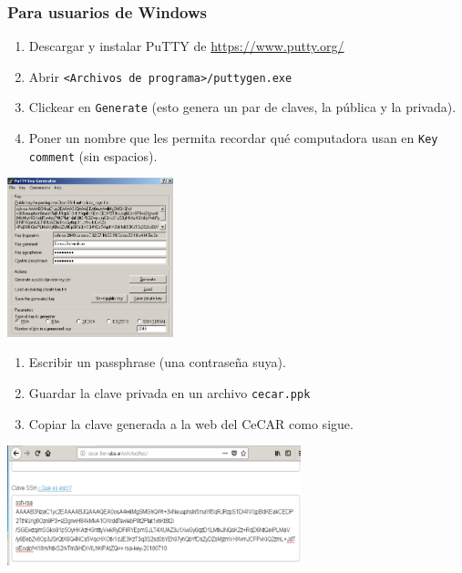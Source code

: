 \documentclass[]{beamer}
\begin{document}
\begin{frame}
\frametitle{Para usuarios de Windows}
\begin{enumerate}
  \item Descargar y instalar PuTTY de \url{https://www.putty.org/}
  \item Abrir \Verb=<Archivos de programa>/puttygen.exe=
  \item Clickear en \Verb=Generate= (esto genera un par de claves, la pública y la privada).
  \item Poner un nombre que les permita recordar qué computadora usan en \Verb=Key comment= (sin espacios).
\end{enumerate}
  \begin{center}
  \includegraphics[width=13em]{./puttygen}
  \end{center} 
\end{frame}

\begin{frame}
\begin{enumerate}
  \item Escribir un passphrase (una contraseña suya).
  \item Guardar la clave privada en un archivo \Verb=cecar.ppk=
  \item Copiar la clave generada a la web del CeCAR como sigue.
\end{enumerate}
\begin{center}
  \includegraphics[width=23em]{./ssh-web-cecar}
  \end{center} 
\end{frame}
\end{document}
